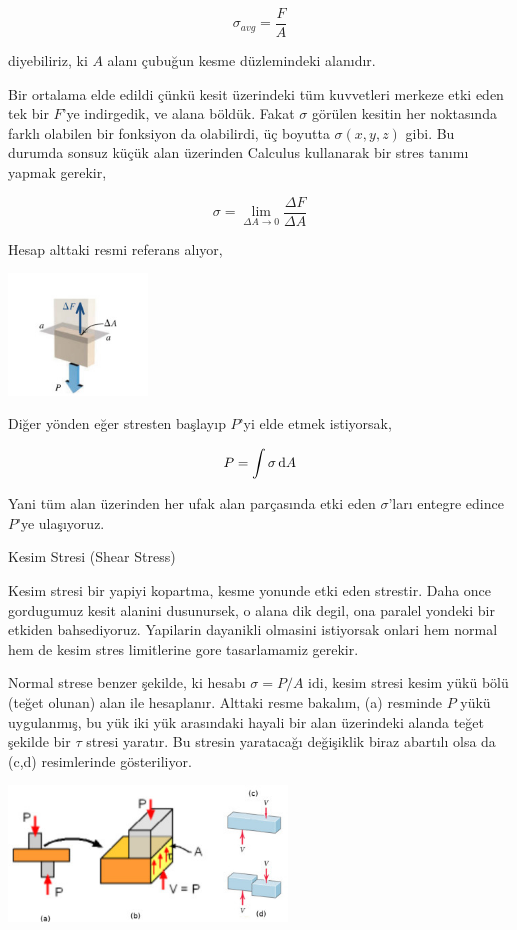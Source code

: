 \documentclass[12pt,fleqn]{article}\usepackage{../../common}
\begin{document}
$$
\sigma_{avg} = \frac{F}{A}
$$

diyebiliriz, ki $A$ alanı çubuğun kesme düzlemindeki alanıdır.

Bir ortalama elde edildi çünkü kesit üzerindeki tüm kuvvetleri merkeze etki eden
tek bir $F$'ye indirgedik, ve alana böldük. Fakat $\sigma$ görülen kesitin her
noktasında farklı olabilen bir fonksiyon da olabilirdi, üç boyutta
$\sigma(x,y,z)$ gibi. Bu durumda sonsuz küçük alan üzerinden Calculus kullanarak
bir stres tanımı yapmak gerekir,

$$
\sigma = \lim_{\Delta A \to 0} \frac{\Delta F}{\Delta A}
$$

Hesap alttaki resmi referans alıyor,

\includegraphics[width=10em]{phy_020_strs_01_02.jpg}

Diğer yönden eğer stresten başlayıp $P$'yi elde etmek istiyorsak,

$$
P = \int \sigma \,\mathrm{d} A
$$

Yani tüm alan üzerinden her ufak alan parçasında etki eden $\sigma$'ları
entegre edince $P$'ye ulaşıyoruz.

Kesim Stresi (Shear Stress)

Kesim stresi bir yapiyi kopartma, kesme yonunde etki eden strestir. Daha
once gordugumuz kesit alanini dusunursek, o alana dik degil, ona paralel
yondeki bir etkiden bahsediyoruz. Yapilarin dayanikli olmasini istiyorsak
onlari hem normal hem de kesim stres limitlerine gore tasarlamamiz gerekir.

Normal strese benzer şekilde, ki hesabı $\sigma = P/A$ idi, kesim stresi kesim
yükü bölü (teğet olunan) alan ile hesaplanır. Alttaki resme bakalım, (a)
resminde $P$ yükü uygulanmış, bu yük iki yük arasındaki hayali bir alan
üzerindeki alanda teğet şekilde bir $\tau$ stresi yaratır. Bu stresin yaratacağı
değişiklik biraz abartılı olsa da (c,d) resimlerinde gösteriliyor.

\includegraphics[width=20em]{phy_020_strs_01_03.jpg}
\end{document}
